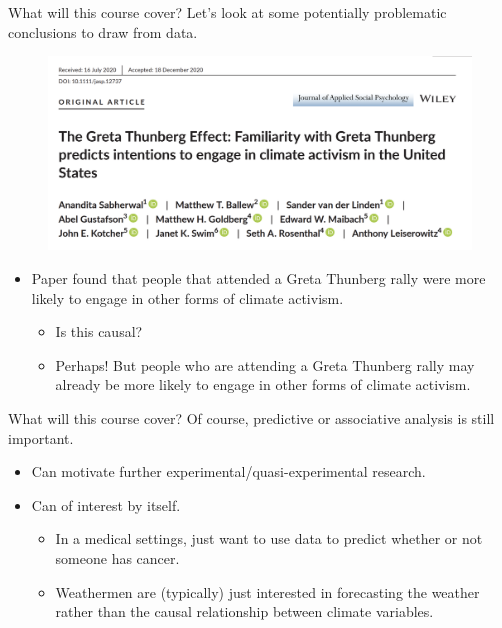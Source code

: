 \documentclass[notheorems,9pt]{beamer}
\begin{document}
\begin{frame}{What will this course cover?} 
	Let's look at some potentially problematic conclusions to draw from data.
	\begin{figure}[htpb]
		\centering
		\includegraphics[width=0.8\linewidth]{greta.png}
	\end{figure}
	\begin{itemize}
		\item Paper found that people that attended a Greta Thunberg rally were more likely to engage in other forms of climate activism. 
		\begin{itemize}
			\item Is this causal?
			\item Perhaps! But people who are attending a Greta Thunberg rally may already be more likely to engage in other forms of climate activism.
		\end{itemize}
	\end{itemize}
\end{frame}
\begin{frame}{What will this course cover?} 
	Of course, predictive or associative analysis is still important.
	\begin{itemize}
		\item<1-> Can motivate further experimental/quasi-experimental research. 
		\item<2-> Can of interest by itself.
		\begin{itemize}
			\item In a medical settings, just want to use data to predict whether or not someone has cancer.
			\item Weathermen are (typically) just interested in forecasting the weather rather than the causal relationship between climate variables.
		\end{itemize}
	\end{itemize}
\end{frame}
\end{document}
